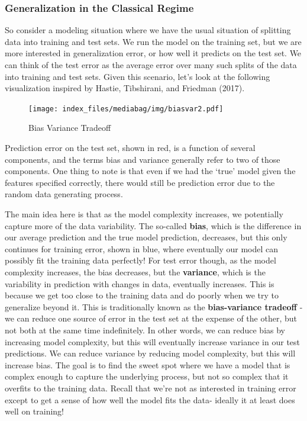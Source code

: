 \documentclass[
  letterpaper,
]{krantz}
\begin{document}
\subsubsection{Generalization in the Classical
Regime}\label{generalization-in-the-classical-regime}

So consider a modeling situation where we have the usual situation of
splitting data into training and test sets. We run the model on the
training set, but we are more interested in generalization error, or how
well it predicts on the test set. We can think of the test error as the
average error over many such splits of the data into training and test
sets. Given this scenario, let's look at the following visualization
inspired by Hastie, Tibshirani, and Friedman (2017).

\begin{figure}

{\centering \texttt{[image: index\_files/mediabag/img/biasvar2.pdf]}

}

\caption{\label{fig-bias-variance}Bias Variance Tradeoff}

\end{figure}

Prediction error on the test set, shown in red, is a function of several
components, and the terms bias and variance generally refer to two of
those components. One thing to note is that even if we had the `true'
model given the features specified correctly, there would still be
prediction error due to the random data generating process.

The main idea here is that as the model complexity increases, we
potentially capture more of the data variability. The so-called
\textbf{bias}, which is the difference in our average prediction and the
true model prediction, decreases, but this only continues for training
error, shown in blue, where eventually our model can possibly fit the
training data perfectly! For test error though, as the model complexity
increases, the bias decreases, but the \textbf{variance}, which is the
variability in prediction with changes in data, eventually increases.
This is because we get too close to the training data and do poorly when
we try to generalize beyond it. This is traditionally known as the
\textbf{bias-variance tradeoff} - we can reduce one source of error in
the test set at the expense of the other, but not both at the same time
indefinitely. In other words, we can reduce bias by increasing model
complexity, but this will eventually increase variance in our test
predictions. We can reduce variance by reducing model complexity, but
this will increase bias. The goal is to find the sweet spot where we
have a model that is complex enough to capture the underlying process,
but not so complex that it overfits to the training data. Recall that
we're not as interested in training error except to get a sense of how
well the model fits the data- ideally it at least does well on training!
\end{document}
